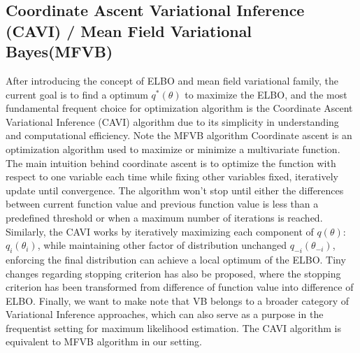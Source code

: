 \subsection{Coordinate Ascent Variational Inference (CAVI) / Mean Field Variational Bayes(MFVB)}
After introducing the concept of ELBO and mean field variational family, the current goal is to find a optimum $q^*(\theta)$ to maximize the ELBO, and the most fundamental frequent choice for optimization algorithm is the Coordinate Ascent Variational Inference (CAVI) algorithm due to its simplicity in understanding and computational efficiency. Note the MFVB algorithm Coordinate ascent is an optimization algorithm used to maximize or minimize a multivariate function. The main intuition behind coordinate ascent is to optimize the function with respect to one variable each time while fixing other variables fixed, iteratively update until convergence. The algorithm won't stop until either the differences between current function value and previous function value is less than a predefined threshold or when a maximum number of iterations is reached.
Similarly, the CAVI works by iteratively maximizing each component of $q(\theta)$: $q_i(\theta_i)$, while maintaining other factor of distribution unchanged $q_{-i}(\theta_{-i})$, enforcing the final distribution can achieve a local optimum of the ELBO. 
Tiny changes regarding stopping criterion has also be proposed, where the stopping criterion has been transformed from difference of function value into difference of ELBO.
Finally, we want to make note that VB belongs to a broader category of Variational Inference approaches, which can also serve as a purpose in the frequentist setting for maximum likelihood estimation. The CAVI algorithm is equivalent to MFVB algorithm in our setting.

